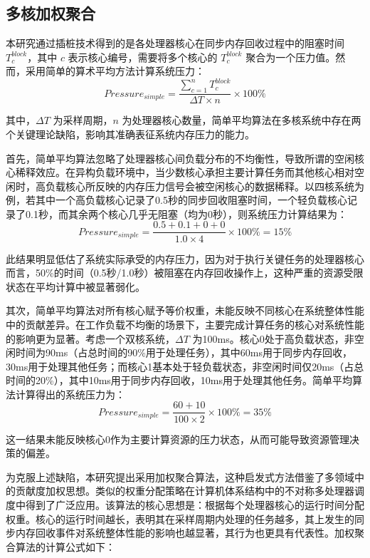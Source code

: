 \subsection{多核加权聚合}
\label{sec:weighted_aggregation}
本研究通过插桩技术得到的是各处理器核心在同步内存回收过程中的阻塞时间 \(T_c^{block}\)，其中 \(c\) 表示核心编号，需要将多个核心的 \(T_c^{block}\) 聚合为一个压力值。然而，采用简单的算术平均方法计算系统压力：
\begin{equation}
    \label{eq:simple_average_pressure}
    Pressure_{simple} = \frac{\sum_{c=1}^{n} T_c^{block}}{\Delta T \times n} \times 100\%
\end{equation}

其中，\(\Delta T\) 为采样周期，\(n\) 为处理器核心数量，简单平均算法在多核系统中存在两个关键理论缺陷，影响其准确表征系统内存压力的能力。

首先，简单平均算法忽略了处理器核心间负载分布的不均衡性，导致所谓的空闲核心稀释效应。在异构负载环境中，当少数核心承担主要计算任务而其他核心相对空闲时，高负载核心所反映的内存压力信号会被空闲核心的数据稀释。以四核系统为例，若其中一个高负载核心记录了0.5秒的同步回收阻塞时间，一个轻负载核心记录了0.1秒，而其余两个核心几乎无阻塞（均为0秒），则系统压力计算结果为：
\[
Pressure_{simple} = \frac{0.5 + 0.1 + 0 + 0}{1.0 \times 4} \times 100\% = 15\%
\]

此结果明显低估了系统实际承受的内存压力，因为对于执行关键任务的处理器核心而言，50\%的时间（0.5秒/1.0秒）被阻塞在内存回收操作上，这种严重的资源受限状态在平均计算中被显著弱化。

其次，简单平均算法对所有核心赋予等价权重，未能反映不同核心在系统整体性能中的贡献差异。在工作负载不均衡的场景下，主要完成计算任务的核心对系统性能的影响更为显著。考虑一个双核系统，\(\Delta T\) 为100ms。核心0处于高负载状态，非空闲时间为90ms（占总时间的90\%用于处理任务），其中60ms用于同步内存回收，30ms用于处理其他任务；而核心1基本处于轻负载状态，非空闲时间仅20ms（占总时间的20\%），其中10ms用于同步内存回收，10ms用于处理其他任务。简单平均算法计算得出的系统压力为：
\[
Pressure_{simple} = \frac{60 + 10}{100 \times 2} \times 100\% = 35\%
\]

这一结果未能反映核心0作为主要计算资源的压力状态，从而可能导致资源管理决策的偏差。

为克服上述缺陷，本研究提出采用加权聚合算法，这种启发式方法借鉴了多领域中的贡献度加权思想。类似的权重分配策略在计算机体系结构中的不对称多处理器调度中得到了广泛应用。该算法的核心思想是：根据每个处理器核心的运行时间分配权重。核心的运行时间越长，表明其在采样周期内处理的任务越多，其上发生的同步内存回收事件对系统整体性能的影响也越显著，其行为也更具有代表性。加权聚合算法的计算公式如下：

